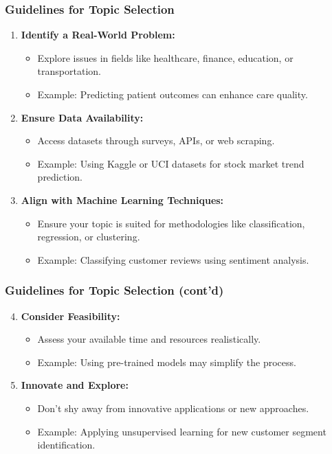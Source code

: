 \documentclass[aspectratio=169]{beamer}
\begin{document}
\begin{frame}[fragile]
    \frametitle{Guidelines for Topic Selection}
    \begin{enumerate}
        \item \textbf{Identify a Real-World Problem:}
            \begin{itemize}
                \item Explore issues in fields like healthcare, finance, education, or transportation.
                \item Example: Predicting patient outcomes can enhance care quality.
            \end{itemize}
        
        \item \textbf{Ensure Data Availability:}
            \begin{itemize}
                \item Access datasets through surveys, APIs, or web scraping.
                \item Example: Using Kaggle or UCI datasets for stock market trend prediction.
            \end{itemize}
        
        \item \textbf{Align with Machine Learning Techniques:}
            \begin{itemize}
                \item Ensure your topic is suited for methodologies like classification, regression, or clustering.
                \item Example: Classifying customer reviews using sentiment analysis.
            \end{itemize}
    \end{enumerate}
\end{frame}

\begin{frame}[fragile]
    \frametitle{Guidelines for Topic Selection (cont'd)}
    \begin{enumerate}
        \setcounter{enumi}{3} %
        \item \textbf{Consider Feasibility:}
            \begin{itemize}
                \item Assess your available time and resources realistically.
                \item Example: Using pre-trained models may simplify the process.
            \end{itemize}
        
        \item \textbf{Innovate and Explore:}
            \begin{itemize}
                \item Don't shy away from innovative applications or new approaches.
                \item Example: Applying unsupervised learning for new customer segment identification.
            \end{itemize}
    \end{enumerate}
\end{frame}
\end{document}
